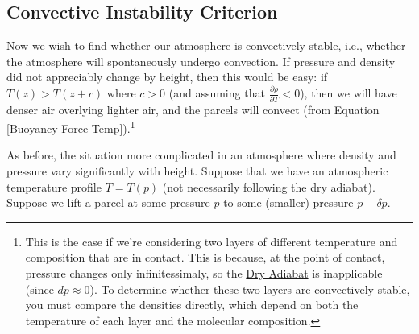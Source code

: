 \subsection{Convective Instability Criterion}

Now we wish to find whether our atmosphere is convectively stable, i.e., whether the atmosphere will spontaneously undergo convection. If pressure and density did not appreciably change by height, then this would be easy: if \(T(z)>T(z+c)\) where \(c>0\) (and assuming that \(\frac{\partial \rho}{\partial T}<0\)), then we will have denser air overlying lighter air, and the parcels will convect (from Equation \ref{Buoyancy Force Temp}).\footnote{
    This is the case if we're considering two layers of different temperature and composition that are in contact. This is because, at the point of contact, pressure changes only infinitessimaly, so the \hyperref[Dry Adiabat]{Dry Adiabat} is inapplicable (since \(dp\approx0\)). To determine whether these two layers are convectively stable, you must compare the densities directly, which depend on both the temperature of each layer and the molecular composition.
}

As before, the situation more complicated in an atmosphere where density and pressure vary significantly with height. Suppose that we have an atmospheric temperature profile \(T=T(p)\) (not necessarily following the dry adiabat). Suppose we lift a parcel at some pressure \(p\) to some (smaller) pressure \(p-\delta p\).

